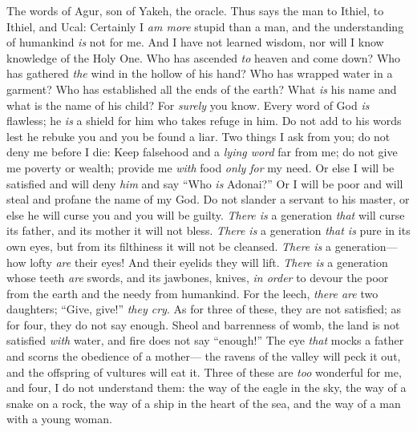 \begin{biblechapter} %
 The words of Agur, son of Yakeh, the oracle. 
Thus says the man to Ithiel, to Ithiel, and Ucal:
\verse Certainly I \textit{am more} stupid than a man, 
and the understanding of humankind \textit{is} not for me.
\verse And I have not learned wisdom, 
nor will I know knowledge of the Holy One.
\verse Who has ascended \textit{to} heaven and come down? 
Who has gathered \textit{the} wind in the hollow of his hand? 
Who has wrapped water in a garment? 
Who has established all the ends of the earth? 
What \textit{is} his name and what is the name of his child? 
For \textit{surely} you know.
\verse Every word of God \textit{is} flawless; 
he \textit{is} a shield for him who takes refuge in him.
\verse Do not add to his words 
lest he rebuke you and you be found a liar.
\verse Two things I ask from you; 
do not deny me before I die:
\verse Keep falsehood and a \textit{lying word} far from me; 
do not give me poverty or wealth; 
provide me \textit{with} food \textit{only for} my need.
\verse Or else I will be satisfied and will deny \textit{him} 
and say “Who \textit{is} Adonai?” 
Or I will be poor and will steal 
and profane the name of my God.
\verse Do not slander a servant to his master, 
or else he will curse you and you will be guilty.
\verse \textit{There is} a generation \textit{that} will curse its father, 
and its mother it will not bless.
\verse \textit{There is} a generation \textit{that is} pure in its own eyes, 
but from its filthiness it will not be cleansed.
\verse \textit{There is} a generation—how lofty \textit{are} their eyes! 
And their eyelids they will lift.
\verse \textit{There is} a generation whose teeth \textit{are} swords, 
and its jawbones, knives, 
\textit{in order} to devour the poor from the earth 
and the needy from humankind.
\verse For the leech, \textit{there are} two daughters; 
“Give, give!” \textit{they cry}. 
As for three of these, they are not satisfied; 
as for four, they do not say enough.
\verse Sheol and barrenness of womb, 
the land is not satisfied \textit{with} water, 
and fire does not say “enough!”
\verse The eye \textit{that} mocks a father 
and scorns the obedience of a mother— 
the ravens of the valley will peck it out, 
and the offspring of vultures will eat it.
\verse Three of these are \textit{too} wonderful for me, 
and four, I do not understand them:
\verse the way of the eagle in the sky, 
the way of a snake on a rock, 
the way of a ship in the heart of the sea, 
and the way of a man with a young woman.

\end{biblechapter}

